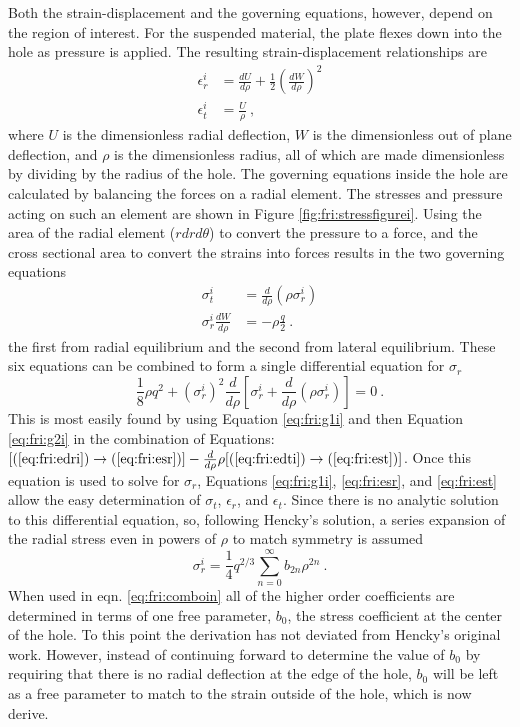 Both the strain-displacement and the governing equations, however, depend on the region of interest.
For the suspended material, the plate flexes down into the hole as pressure is applied.
The resulting strain-displacement relationships are
\begin{align}
	\epsilon_r^i&=\frac{dU}{d\rho}+\frac{1}{2} (\frac{dW}{d\rho})^2 \label{eq:fri:edri}\\
	\epsilon_t^i&=\frac{U}{\rho} \label{eq:fri:edti} \ ,
\end{align}
where $U$ is the dimensionless radial deflection, $W$ is the dimensionless out of plane deflection, and $\rho$ is the dimensionless radius, all of which are made dimensionless by dividing by the radius of the hole.
The governing equations inside the hole are calculated by balancing the forces on a radial element.
The stresses and pressure acting on such an element are shown in Figure \ref{fig:fri:stressfigurei}.
Using the area of the radial element ($r dr d\theta$) to convert the pressure to a force, and the cross sectional area to convert the strains into forces results in the two governing equations
\begin{align}
	\sigma_t^i&=\frac{d}{d \rho}(\rho \sigma_r^i) \label{eq:fri:g1i}\\
	\sigma_r^i \frac{dW}{d \rho}&=-\rho \frac{q}{2} \label{eq:fri:g2i} \ .
\end{align}
the first from radial equilibrium and the second from lateral equilibrium.
These six equations can be combined to form a single differential equation for $\sigma_r$
\begin{equation}
	\frac{1}{8} \rho q^2+ (\sigma_r^i)^2 \frac{d}{d\rho}[\sigma_r^i+\frac{d}{d\rho}(\rho \sigma_r^i)]=0 \ .
	\label{eq:fri:comboin}
\end{equation}
This is most easily found by using Equation \ref{eq:fri:g1i} and then Equation \ref{eq:fri:g2i} in the combination of Equations: $[(\ref{eq:fri:edri}) \rightarrow (\ref{eq:fri:esr})]-\frac{d}{d \rho}\rho[(\ref{eq:fri:edti})\rightarrow(\ref{eq:fri:est})]$.
Once this equation is used to solve for $\sigma_r$, Equations \ref{eq:fri:g1i}, \ref{eq:fri:esr}, and \ref{eq:fri:est} allow the easy determination of $\sigma_t$, $\epsilon_r$, and $\epsilon_t$.
Since there is no analytic solution to this differential equation, so, following Hencky's solution, a series expansion of the radial stress even in powers of $\rho$ to match symmetry is assumed
\begin{equation}
	\sigma_r^i=\frac{1}{4} q^{2/3} \sum_{n=0}^{\infty} b_{2n} \rho^{2n} \ .
\end{equation}
When used in eqn. \ref{eq:fri:comboin} all of the higher order coefficients are determined in terms of one free parameter, $b_0$, the stress coefficient at the center of the hole.
To this point the derivation has not deviated from Hencky's original work.
However, instead of continuing forward to determine the value of $b_0$ by requiring that there is no radial deflection at the edge of the hole, $b_0$ will be left as a free parameter to match to the strain outside of the hole, which is now derive.

